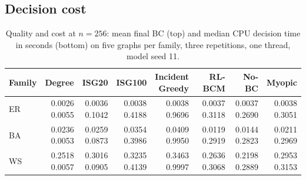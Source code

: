 \documentclass[runningheads]{llncs}
\newcommand{\rlbcm}{RL-BCM}
\begin{document}
\subsection{Decision cost}
\begin{table}[t]
\centering
\caption{Quality and cost at $n=256$: mean final BC (top) and median CPU
decision time in seconds (bottom) on five graphs per family, three
repetitions, one thread, model seed 11.}
\label{tab:timing}
\small
\setlength{\tabcolsep}{3.5pt}
\begin{tabular}{lrrrrrrr}
\toprule
Family & Degree & ISG20 & ISG100 & \shortstack{Incident\\Greedy} & \rlbcm & No-BC & Myopic \\
\midrule
ER & \shortstack[r]{0.0026\\{\scriptsize 0.0055}} & \shortstack[r]{0.0036\\{\scriptsize 0.1042}} & \shortstack[r]{0.0038\\{\scriptsize 0.4188}} & \shortstack[r]{0.0038\\{\scriptsize 0.9696}} & \shortstack[r]{0.0037\\{\scriptsize 0.3118}} & \shortstack[r]{0.0037\\{\scriptsize 0.2690}} & \shortstack[r]{0.0038\\{\scriptsize 0.3051}} \\
BA & \shortstack[r]{0.0236\\{\scriptsize 0.0053}} & \shortstack[r]{0.0259\\{\scriptsize 0.0873}} & \shortstack[r]{0.0354\\{\scriptsize 0.3986}} & \shortstack[r]{0.0409\\{\scriptsize 0.9950}} & \shortstack[r]{0.0119\\{\scriptsize 0.2919}} & \shortstack[r]{0.0144\\{\scriptsize 0.2823}} & \shortstack[r]{0.0211\\{\scriptsize 0.2969}} \\
WS & \shortstack[r]{0.2518\\{\scriptsize 0.0057}} & \shortstack[r]{0.3016\\{\scriptsize 0.0905}} & \shortstack[r]{0.3235\\{\scriptsize 0.4139}} & \shortstack[r]{0.3463\\{\scriptsize 0.9997}} & \shortstack[r]{0.2636\\{\scriptsize 0.3068}} & \shortstack[r]{0.2198\\{\scriptsize 0.2889}} & \shortstack[r]{0.2953\\{\scriptsize 0.3153}} \\
\bottomrule
\end{tabular}
\end{table}
\end{document}
